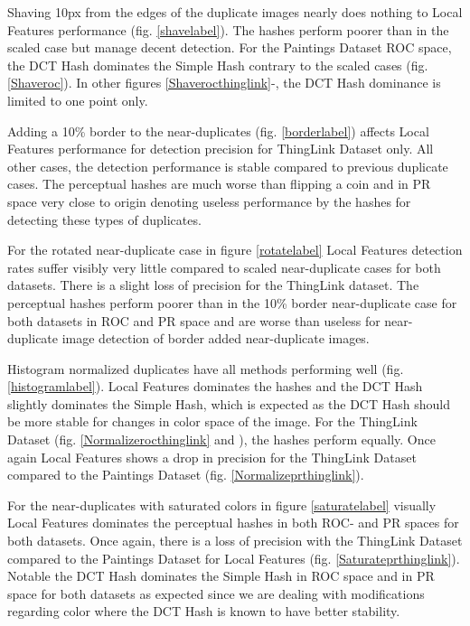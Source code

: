 \documentclass[english,12pt,a4paper,pdftex,elec,utf8, table]{aaltothesis}
\begin{document}
Shaving 10px from the edges of the duplicate images nearly does nothing to Local Features performance (fig. \ref{shavelabel}). The hashes perform poorer than in the scaled case but manage decent detection. For the Paintings Dataset ROC space, the DCT Hash dominates the Simple Hash contrary to the scaled cases (fig. \ref{Shaveroc}). In other figures \ref{Shaverocthinglink}-, the DCT Hash dominance is limited to one point only.

Adding a 10\% border to the near-duplicates (fig. \ref{borderlabel}) affects Local Features performance for detection precision for ThingLink Dataset only. All other cases, the detection performance is stable compared to previous duplicate cases. The perceptual hashes are much worse than flipping a coin and in PR space very close to origin denoting useless performance by the hashes for detecting these types of duplicates.

For the rotated near-duplicate case in figure \ref{rotatelabel} Local Features detection rates suffer visibly very little compared to scaled near-duplicate cases for both datasets. There is a slight loss of precision for the ThingLink dataset. The perceptual hashes perform poorer than in the 10\% border near-duplicate case for both datasets in ROC and PR space and are worse than useless for near-duplicate image detection of border added near-duplicate images.

Histogram normalized duplicates have all methods performing well (fig. \ref{histogramlabel}). Local Features dominates the hashes and the DCT Hash slightly dominates the Simple Hash, which is expected as the DCT Hash should be more stable for changes in color space of the image. For the ThingLink Dataset (fig. \ref{Normalizerocthinglink} and ), the hashes perform equally. Once again Local Features shows a drop in precision for the ThingLink Dataset compared to the Paintings Dataset (fig. \ref{Normalizeprthinglink}).

For the near-duplicates with saturated colors in figure \ref{saturatelabel} visually Local Features dominates the perceptual hashes in both ROC- and PR spaces for both datasets. Once again, there is a loss of precision with the ThingLink Dataset compared to the Paintings Dataset for Local Features (fig. \ref{Saturateprthinglink}). Notable the DCT Hash dominates the Simple Hash in ROC space and in PR space for both datasets as expected since we are dealing with modifications regarding color where the DCT Hash is known to have better stability\cite{Zauner2010}.
\end{document}
